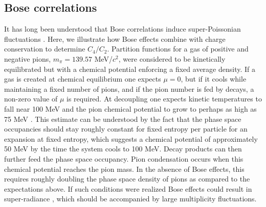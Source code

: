 \subsection{Bose correlations}\label{sec:bose_uniform}

It has long been understood that Bose correlations induce super-Poissonian fluctuations \cite{Carruthers:1983my,Carruthers:1989jj}. Here, we illustrate how Bose effects combine with charge conservation to determine $C_4/C_2$. Partition functions for a gas of positive and negative pions, $m_\pi=139.57$ MeV/$c^2$, were considered to be kinetically equilibrated but with a chemical potential enforcing a fixed average density. If a gas is created at chemical equilibrium one expects $\mu=0$, but if it cools while maintaining a fixed number of pions, and if the pion number is fed by decays, a non-zero value of $\mu$ is required. At decoupling one expects kinetic temperatures to fall near 100 MeV and the pion chemical potential to grow to perhaps as high as 75 MeV \cite{Greiner:1993jn}. This estimate can be understood by the fact that the phase space occupancies should stay roughly constant for fixed entropy per particle for an expansion at fixed entropy, which suggests a chemical potential of approximately 50 MeV by the time the system cools to 100 MeV. Decay products can then further feed the phase space occupancy. Pion condensation occurs when this chemical potential reaches the pion mass. In the absence of Bose effects, this requires roughly doubling the phase space density of pions as compared to the expectations above. If such conditions were realized Bose effects could result in super-radiance \cite{Pratt:1993uy}, which should be accompanied by large multiplicity fluctuations. 

